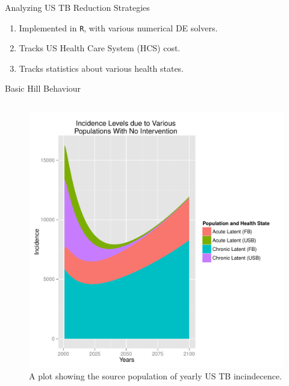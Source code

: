 \documentclass[final]{beamer}
\begin{document}
\begin{frame}
\begin{columns}
    \begin{column}{.3\textwidth}
      \begin{block}{Analyzing US TB Reduction Strategies}
        \begin{enumerate}
          \item Implemented in \texttt{R}, with various numerical DE solvers.
          \item Tracks US Health Care System (HCS) cost.
          \item Tracks statistics about various health states.
        \end{enumerate}
        \begin{block}{Basic Hill Behaviour}
          \begin{column}{.45\textwidth}
            \begin{figure}[h]
              \begin{center}
                \includegraphics[scale=1]{incPlotSourced}
              \end{center}
              \caption{A plot showing the source population of yearly US TB
              incindecence.}
              \label{fig:incPlotSourced}
            \end{figure}
          \end{column}
          \begin{column}{.45\textwidth}

\end{column}
\end{block}
\end{block}
\end{column}
\end{columns}
\end{frame}
\end{document}
